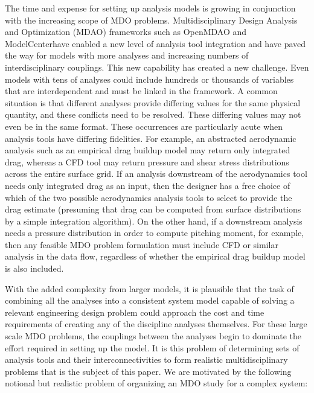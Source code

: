     The time and expense for setting up 
    analysis models is growing in conjunction with the increasing scope of MDO problems. 
    Multidisciplinary Design Analysis and Optimization (MDAO)
    frameworks such as OpenMDAO\cite{Gray2012} and {ModelCenter}\textregistered have enabled a new level of analysis tool integration 
    and have paved the way for models with more analyses and increasing numbers of interdisciplinary couplings. This 
    new capability has created a new challenge. Even models with tens of analyses could include hundreds or thousands
    of variables that are interdependent and must be linked in the framework. 
    A common situation is that different analyses provide differing values for the 
    same physical quantity, and these conflicts need to be resolved. These differing values 
    may not even be in the same format. These occurrences are particularly acute when analysis tools have differing fidelities. For
    example, an abstracted aerodynamic analysis such as an empirical drag buildup model may return only
    integrated drag, whereas a CFD tool may return pressure and shear stress distributions across the entire
    surface grid. If an analysis downstream of the aerodynamics tool needs only integrated drag as an input,
    then the designer has a free choice of which of the two possible aerodynamics analysis tools to select to
    provide the drag estimate (presuming that drag can be computed from surface distributions by a simple
    integration algorithm). On the other hand, if a downstream analysis needs a pressure distribution in
    order to compute pitching moment, for example, then any feasible MDO problem formulation must
    include CFD or similar analysis in the data flow, regardless of whether the empirical drag buildup model
    is also included.

    With the added complexity from larger models, it is plausible that the task of combining all the analyses into a 
    consistent system model capable of solving a relevant engineering design 
    problem could approach the cost and time requirements of creating any of the discipline 
    analyses themselves. For these large scale MDO problems, the couplings between the 
    analyses begin to dominate the effort required in setting up the model. It is this problem of 
    determining sets of analysis tools and their interconnectivities to form realistic
    multidisciplinary problems that is the subject of this paper. We are motivated by the following notional
    but realistic problem of organizing an MDO study for a complex system:

